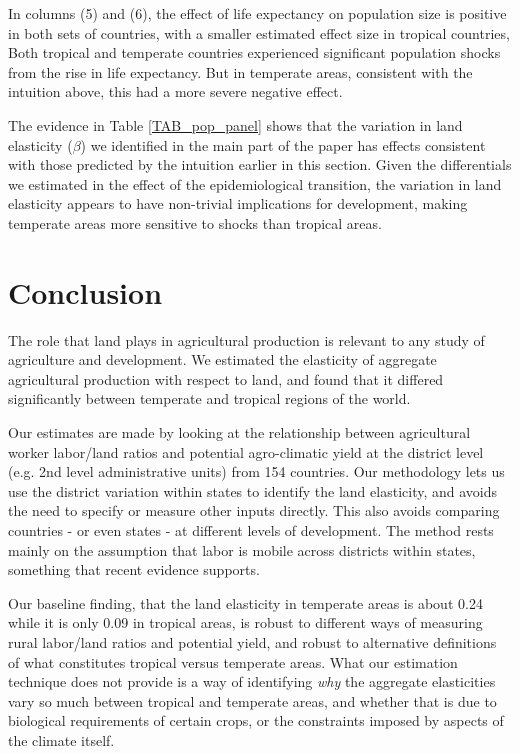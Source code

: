 \documentclass[11pt]{article}
\begin{document}
In columns (5) and (6), the effect of life expectancy on population size is positive in both sets of countries, with a smaller estimated effect size in tropical countries, Both tropical and temperate countries experienced significant population shocks from the rise in life expectancy. But in temperate areas, consistent with the intuition above, this had a more severe negative effect.

The evidence in Table \ref{TAB_pop_panel} shows that the variation in land elasticity ($\beta$) we identified in the main part of the paper has effects consistent with those predicted by the intuition earlier in this section. Given the differentials we estimated in the effect of the epidemiological transition, the variation in land elasticity appears to have non-trivial implications for development, making temperate areas more sensitive to shocks than tropical areas.

\section{Conclusion}
The role that land plays in agricultural production is relevant to any study of agriculture and development. We estimated the elasticity of aggregate agricultural production with respect to land, and found that it differed significantly between temperate and tropical regions of the world.

Our estimates are made by looking at the relationship between agricultural worker labor/land ratios and potential agro-climatic yield at the district level (e.g. 2nd level administrative units) from 154 countries. Our methodology lets us use the district variation within states to identify the land elasticity, and avoids the need to specify or measure other inputs directly. This also avoids comparing countries - or even states - at different levels of development. The method rests mainly on the assumption that labor is mobile across districts within states, something that recent evidence supports. 

Our baseline finding, that the land elasticity in temperate areas is about 0.24 while it is only 0.09 in tropical areas, is robust to different ways of measuring rural labor/land ratios and potential yield, and robust to alternative definitions of what constitutes tropical versus temperate areas. What our estimation technique does not provide is a way of identifying \textit{why} the aggregate elasticities vary so much between tropical and temperate areas, and whether that is due to biological requirements of certain crops, or the constraints imposed by aspects of the climate itself.
\end{document}
